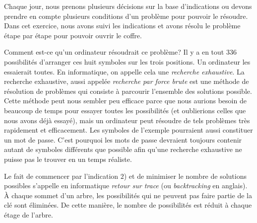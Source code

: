 {{Chaque jour, nous prenons plusieurs décisions sur la base d’indications ou devons prendre en compte plusieurs conditions d’un problème pour pouvoir le résoudre. Dans cet exercice, nous avons suivi les indications et avons résolu le problème étape par étape pour pouvoir ouvrir le coffre.

Comment est-ce qu’un ordinateur résoudrait ce problème? Il y a en tout $336$ possibilités d’arranger ces huit symboles sur les trois positions. Un ordinateur les essaierait toutes. En informatique, on appelle cela une \emph{recherche exhaustive}. La recherche exhaustive, aussi appelée \emph{recherche par force brute}  est une méthode de résolution de problèmes qui consiste à parcourir l’ensemble des solutions possible. Cette méthode peut nous sembler peu efficace parce que nous aurions besoin de beaucoup de temps pour essayer toutes les possibilités (et oublierions celles que nous avons déjà essayé), mais un ordinateur peut résoudre de tels problèmes très rapidement et efficacement. Les symboles de l’exemple pourraient aussi constituer un mot de passe. C’est pourquoi les mots de passe devraient toujours contenir autant de symboles différents que possible afin qu’une recherche exhaustive ne puisse pas le trouver en un temps réaliste.

Le fait de commencer par l’indication $2$) et de minimiser le nombre de solutions possibles s’appelle en informatique \emph{retour sur trace} (ou \emph{backtracking} en anglais). À chaque sommet d’un arbre, les possibilités qui ne peuvent pas faire partie de la clé sont éliminées. De cette manière, le nombre de possibilités est réduit à chaque étage de l’arbre.



}}
